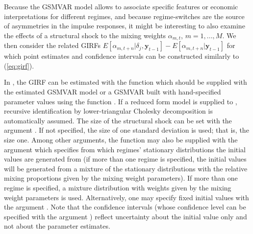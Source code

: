 \documentclass[nojss]{jss}
\begin{document}
Because the GSMVAR model allows to associate specific features or economic interpretations for different regimes, and because regime-switches are the source of asymmetries in the impulse responses, it might be interesting to also examine the effects of a structural shock to the mixing weights $\alpha_{m,t}$, $m=1,...,M$. We then consider the related GIRFs $E[\alpha_{m,t+n}|\delta_j,\boldsymbol{y}_{t-1}] - E[\alpha_{m,t+n}|\boldsymbol{y}_{t-1}]$ for which point estimates and confidence intervals can be constructed similarly to (\ref{eq:girf}).

In , the GIRF can be estimated with the function  which should be supplied with the estimated GSMVAR model or a GSMVAR built with hand-specified parameter values using the function . If a reduced form model is supplied to , recursive identification by lower-triangular Cholesky decomposition is automatically assumed. The size of the structural shock can be set with the argument . If not specified, the size of one standard deviation is used; that is, the size one. Among other arguments, the function may also be supplied with the argument  which specifies from which regimes' stationary distributions the initial values are generated from (if more than one regime is specified, the initial values will be generated from a mixture of the stationary distributions with the relative mixing proportions given by the mixing weight parameters). If more than one regime is specified, a mixture distribution with weights given by the mixing weight parameters is used. Alternatively, one may specify fixed initial values with the argument . Note that the confidence intervals (whose confidence level can be specified with the argument ) reflect uncertainty about the initial value only and not about the parameter estimates.
\end{document}
